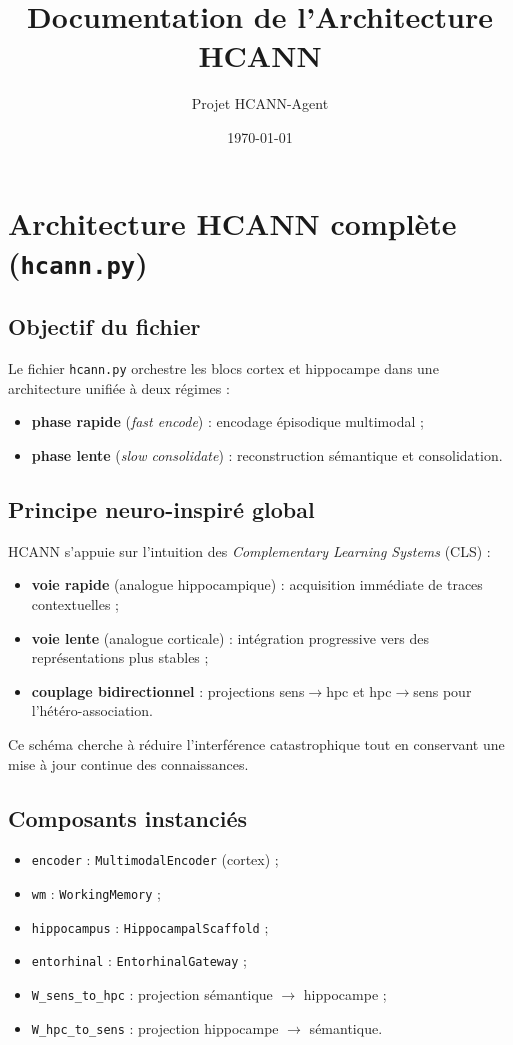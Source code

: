 \documentclass[12pt,a4paper]{article}
\title{Documentation de l'Architecture HCANN}
\author{Projet HCANN-Agent}
\date{\today}
\begin{document}
\maketitle

\section{Architecture HCANN complète (\texttt{hcann.py})}

\subsection{Objectif du fichier}
Le fichier \texttt{hcann.py} orchestre les blocs cortex et hippocampe dans une architecture unifiée à deux régimes :
\begin{itemize}
    \item \textbf{phase rapide} (\textit{fast encode}) : encodage épisodique multimodal ;
    \item \textbf{phase lente} (\textit{slow consolidate}) : reconstruction sémantique et consolidation.
\end{itemize}

\subsection{Principe neuro-inspiré global}
HCANN s'appuie sur l'intuition des \textit{Complementary Learning Systems} (CLS) :
\begin{itemize}
    \item \textbf{voie rapide} (analogue hippocampique) : acquisition immédiate de traces contextuelles ;
    \item \textbf{voie lente} (analogue corticale) : intégration progressive vers des représentations plus stables ;
    \item \textbf{couplage bidirectionnel} : projections sens$\rightarrow$hpc et hpc$\rightarrow$sens pour l'hétéro-association.
\end{itemize}
Ce schéma cherche à réduire l'interférence catastrophique tout en conservant une mise à jour continue des connaissances.

\subsection{Composants instanciés}
\begin{itemize}
    \item \texttt{encoder} : \texttt{MultimodalEncoder} (cortex) ;
    \item \texttt{wm} : \texttt{WorkingMemory} ;
    \item \texttt{hippocampus} : \texttt{HippocampalScaffold} ;
    \item \texttt{entorhinal} : \texttt{EntorhinalGateway} ;
    \item \texttt{W\_sens\_to\_hpc} : projection sémantique $\rightarrow$ hippocampe ;
    \item \texttt{W\_hpc\_to\_sens} : projection hippocampe $\rightarrow$ sémantique.
\end{itemize}
\end{document}
